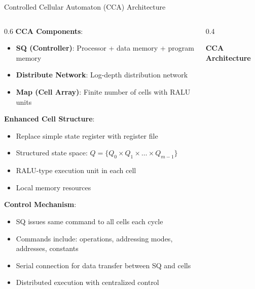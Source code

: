 \documentclass[aspectratio=169]{beamer}
\newcommand{\concept}[1]{\textbf{\color{darkblue}#1}}
\begin{document}
\begin{frame}{Controlled Cellular Automaton (CCA) Architecture}
\begin{columns}
\begin{column}{0.6\textwidth}
\concept{CCA Components}:
\begin{itemize}
\item \textbf{SQ (Controller)}: Processor + data memory + program memory
\item \textbf{Distribute Network}: Log-depth distribution network
\item \textbf{Map (Cell Array)}: Finite number of cells with RALU units
\end{itemize}

\vspace{0.3cm}
\concept{Enhanced Cell Structure}:
\begin{itemize}
\item Replace simple state register with register file
\item Structured state space: $Q = \{Q_0 \times Q_1 \times \ldots \times Q_{m-1}\}$
\item RALU-type execution unit in each cell
\item Local memory resources
\end{itemize}

\vspace{0.3cm}
\concept{Control Mechanism}:
\begin{itemize}
\item SQ issues same command to all cells each cycle
\item Commands include: operations, addressing modes, addresses, constants
\item Serial connection for data transfer between SQ and cells
\item Distributed execution with centralized control
\end{itemize}
\end{column}
\begin{column}{0.4\textwidth}
\begin{center}
\textbf{CCA Architecture}
\vspace{0.3cm}

\end{center}
\end{column}
\end{columns}
\end{frame}
\end{document}
